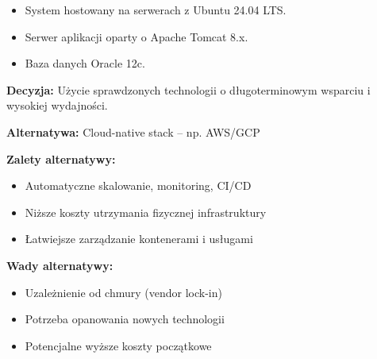\documentclass[12pt]{article}
\begin{document}
\begin{itemize}
\item System hostowany na serwerach z Ubuntu 24.04 LTS.
\item Serwer aplikacji oparty o Apache Tomcat 8.x.
\item Baza danych Oracle 12c.
\end{itemize}

\textbf{Decyzja:} Użycie sprawdzonych technologii o długoterminowym wsparciu i wysokiej wydajności.

\textbf{Alternatywa:} Cloud-native stack – np. AWS/GCP

\textbf{Zalety alternatywy:}
\begin{itemize}
\item Automatyczne skalowanie, monitoring, CI/CD
\item Niższe koszty utrzymania fizycznej infrastruktury
\item Łatwiejsze zarządzanie kontenerami i usługami
\end{itemize}

\textbf{Wady alternatywy:}
\begin{itemize}
\item Uzależnienie od chmury (vendor lock-in)
\item Potrzeba opanowania nowych technologii
\item Potencjalne wyższe koszty początkowe
\end{itemize}
\end{document}

